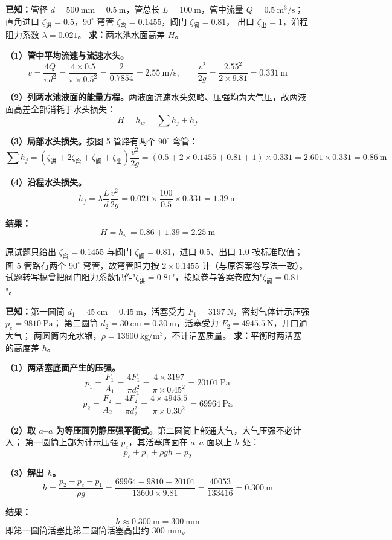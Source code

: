 \begin{jie}
\textbf{已知：}管径 $d=500\ \mathrm{mm}=0.5\ \mathrm{m}$，管总长 $L=100\ \mathrm{m}$，管中流量 $Q=0.5\ \mathrm{m^3/s}$；
直角进口 $\zeta_{\text{进}}=0.5$，$90^\circ$ 弯管 $\zeta_{\text{弯}}=0.1455$，阀门 $\zeta_{\text{阀}}=0.81$，
出口 $\zeta_{\text{出}}=1$，沿程阻力系数 $\lambda=0.021$。
\textbf{求：}两水池水面高差 $H$。

\textbf{（1）管中平均流速与流速水头。}
\[
v=\frac{4Q}{\pi d^2}=\frac{4\times0.5}{\pi\times0.5^2}=\frac{2}{0.7854}=2.55\ \mathrm{m/s},
\qquad
\frac{v^2}{2g}=\frac{2.55^2}{2\times9.81}=0.331\ \mathrm{m}
\]

\textbf{（2）列两水池液面的能量方程。}两液面流速水头忽略、压强均为大气压，故两液面高差全部消耗于水头损失：
\[
H=h_w=\sum h_j+h_f
\]

\textbf{（3）局部水头损失。}按图 5 管路有两个 $90^\circ$ 弯管：
\[
\sum h_j=\left(\zeta_{\text{进}}+2\zeta_{\text{弯}}+\zeta_{\text{阀}}+\zeta_{\text{出}}\right)\frac{v^2}{2g}
=(0.5+2\times0.1455+0.81+1)\times0.331
=2.601\times0.331=0.86\ \mathrm{m}
\]

\textbf{（4）沿程水头损失。}
\[
h_f=\lambda\frac{L}{d}\frac{v^2}{2g}=0.021\times\frac{100}{0.5}\times0.331=1.39\ \mathrm{m}
\]

\textbf{结果：}
\[
\boxed{H=h_w=0.86+1.39=2.25\ \mathrm{m}}
\]
\end{jie}

\begin{tishi}
原试题只给出 $\zeta_{\text{弯}}=0.1455$ 与阀门 $\zeta_{\text{阀}}=0.81$，进口 $0.5$、出口 $1.0$ 按标准取值；
图 5 管路有两个 $90^\circ$ 弯管，故弯管阻力按 $2\times0.1455$ 计（与原答案卷写法一致）。
试题转写稿曾把阀门阻力系数记作"$\zeta_{\text{进}}=0.81$"，按原卷与答案卷应为"$\zeta_{\text{阀}}=0.81$"。
\end{tishi}


\begin{jie}
\textbf{已知：}第一圆筒 $d_1=45\ \mathrm{cm}=0.45\ \mathrm{m}$，活塞受力 $F_1=3197\ \mathrm{N}$，密封气体计示压强 $p_e=9810\ \mathrm{Pa}$；
第二圆筒 $d_2=30\ \mathrm{cm}=0.30\ \mathrm{m}$，活塞受力 $F_2=4945.5\ \mathrm{N}$，开口通大气；
两圆筒内充水银，$\rho=13600\ \mathrm{kg/m^3}$，不计活塞质量。
\textbf{求：}平衡时两活塞的高度差 $h$。

\textbf{（1）两活塞底面产生的压强。}
\[
p_1=\frac{F_1}{A_1}=\frac{4F_1}{\pi d_1^2}=\frac{4\times3197}{\pi\times0.45^2}=20101\ \mathrm{Pa}
\]
\[
p_2=\frac{F_2}{A_2}=\frac{4F_2}{\pi d_2^2}=\frac{4\times4945.5}{\pi\times0.30^2}=69964\ \mathrm{Pa}
\]

\textbf{（2）取 $a$--$a$ 为等压面列静压强平衡式。}第二圆筒上部通大气，大气压强不必计入；
第一圆筒上部为计示压强 $p_e$，其活塞底面在 $a$--$a$ 面以上 $h$ 处：
\[
p_e+p_1+\rho g h=p_2
\]

\textbf{（3）解出 $h$。}
\[
h=\frac{p_2-p_e-p_1}{\rho g}
=\frac{69964-9810-20101}{13600\times9.81}
=\frac{40053}{133416}=0.300\ \mathrm{m}
\]

\textbf{结果：}
\[
\boxed{h\approx0.300\ \mathrm{m}=300\ \mathrm{mm}}
\]
即第一圆筒活塞比第二圆筒活塞高出约 $300$ mm。
\end{jie}

